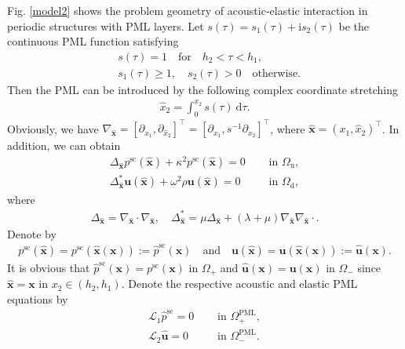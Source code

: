 \documentclass[final,3p,times]{elsarticle}
\begin{document}
Fig. \ref{model2} shows the problem geometry of acoustic-elastic interaction in periodic structures with PML layers. Let $s(\tau)=s_1(\tau)+\mathrm{i} s_2(\tau)$ be the continuous PML function satisfying
\begin{align*}
	& s(\tau)=1 \quad \text{for} \quad h_2<\tau<h_1, \\
	& s_1(\tau) \geq 1, \quad s_2(\tau)>0 \quad \text{otherwise}.
\end{align*}
Then the PML can be introduced by the following complex coordinate stretching
\begin{align*}
	\hat{x}_2=\int_0^{x_2} s(\tau) \mathrm{~d} \tau.
\end{align*}
Obviously, we have $\nabla_{\hat{\boldsymbol{x}}}=\left[\partial_{x_1}, \partial_{\hat{x}_2}\right]^{\top}=\left[\partial_{x_1}, s^{-1} \partial_{x_2}\right]^{\top}$, where $\hat{\boldsymbol{x}}=(x_1, \hat{x}_2)^{\top}$. In addition, we can obtain
\begin{align*}
	\Delta_{\hat{\boldsymbol{x}}} p^\mathrm{sc}(\hat{\boldsymbol{x}}) + \kappa^2 p^\mathrm{sc}(\hat{\boldsymbol{x}})=0 &\quad \text { in } \Omega_\mathrm{u},\\
	\Delta^*_{\hat{\boldsymbol{x}}}\boldsymbol{u}(\hat{\boldsymbol{x}}) +  \omega^2\rho \boldsymbol{u}(\hat{\boldsymbol{x}}) = 0 &\quad \text { in } \Omega_\mathrm{d},
\end{align*}
where
\begin{align*}
	\Delta_{\hat{\boldsymbol{x}}} = \nabla_{\hat{\boldsymbol{x}}} \cdot \nabla_{\hat{\boldsymbol{x}}},\quad
	\Delta^*_{\hat{\boldsymbol{x}}} = \mu \Delta_{\hat{\boldsymbol{x}}}+(\lambda+\mu) \nabla_{\hat{\boldsymbol{x}}} \nabla_{\hat{\boldsymbol{x}}} \cdot.
\end{align*}
Denote by
\begin{align}\label{new flied}
	p^\mathrm{sc}(\hat{\boldsymbol{x}})=p^\mathrm{sc}(\hat{\boldsymbol{x}}(\boldsymbol{x})):=\hat{p}^\mathrm{sc}(\boldsymbol{x})\quad 
	\text{and}\quad 
	\boldsymbol{u}(\hat{\boldsymbol{x}})=\boldsymbol{u}(\hat{\boldsymbol{x}}(\boldsymbol{x})):=\hat{\boldsymbol{u}}(\boldsymbol{x}).
\end{align}  
It is obvious that $\hat{p}^\mathrm{sc}(\boldsymbol{x})=  p^\mathrm{sc}(\boldsymbol{x}) \text { in } \Omega_+$ and $\hat{\boldsymbol{u}}(\boldsymbol{x})=\boldsymbol{u}(\boldsymbol{x}) \text { in } \Omega_-$ since $\hat{\boldsymbol{x}}=\boldsymbol{x}$ in $x_2 \in (h_2, h_1)$.
Denote the respective acoustic and elastic PML equations by
\begin{align*} 
	\mathcal{L}_1\hat{p}^\mathrm{sc}=0 & \quad \text { in } \Omega_+^{\mathrm{PML}}, \\ \mathcal{L}_2 \hat{\boldsymbol{u}} =0 & \quad \text { in } \Omega_-^{\mathrm{PML}}.
\end{align*}
\end{document}
